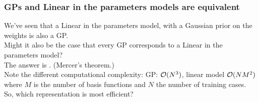 \begin{frame}
\frametitle{GPs and Linear in the parameters models are equivalent}

We've seen that a Linear in the parameters model, with a Gaussian prior on
the weights is also a GP.\\[1ex]

Might it also be the case that every GP corresponds to a Linear in the 
parameters model?\\[1ex]

The answer is . \hfill (Mercer's theorem.)\\[1ex] 

Note the different computational complexity: GP: ${\cal O}(N^3)$,
linear model ${\cal O}(NM^2)$ where $M$ is the number of basis
functions and $N$ the number of training cases.\\[1ex]

So, which representation is most efficient?
\end{frame}


